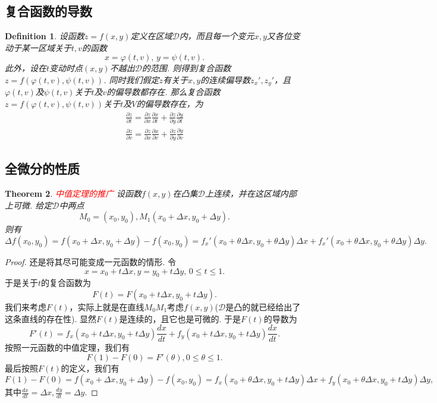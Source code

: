 \documentclass{article}
\newtheorem{theorem}{Theorem}[section]
\newtheorem{definition}[theorem]{Definition}
\newcommand{\redt}[1]{\textcolor{red}{#1}}
\begin{document}
\subsection{复合函数的导数}

\begin{definition}
\rm 设函数$z = f(x,y)$定义在区域$\mathcal{D}$内，而且每一个变元$x,y$又各位变动于某一区域关于$t,v$的函数
$$
x = \varphi(t,v),\, y = \psi(t,v).
$$
此外，设在$t$变动时点$(x,y)$不越出$\mathcal{D}$的范围. 则得到复合函数$z=f(\varphi(t,v),\psi(t,v))$. 同时我们假定$z$有关于$x,y$的连续偏导数$z_x',z_y'$，且$\varphi(t,v)$及$\psi(t,v)$关于$t$及$v$的偏导数都存在. 那么复合函数$z=f(\varphi(t,v),\psi(t,v))$关于$t$及$V$的偏导数存在，为
$$
\begin{array}{ll}
\frac{\partial z}{\partial t} = \frac{\partial z}{\partial x}\frac{\partial x}{\partial t} + \frac{\partial z}{\partial y}\frac{\partial y}{\partial t} \\
\frac{\partial z}{\partial v} = \frac{\partial z}{\partial x}\frac{\partial x}{\partial v} + \frac{\partial z}{\partial y}\frac{\partial y}{\partial v}
\end{array}
$$
\end{definition}

\subsection{全微分的性质}

\begin{theorem}
\rm \redt{中值定理的推广} 设函数$f(x,y)$在凸集$\mathcal{D}$上连续，并在这区域内部上可微. 给定$\mathcal{D}$中两点
$$
M_0 = (x_0,y_0), M_1(x_0+\Delta x,y_0 + \Delta y).
$$
则有
$$
\Delta f(x_0,y_0) = f(x_0+\Delta x, y_0 + \Delta y) - f(x_0,y_0) = f_x'(x_0+\theta\Delta x, y_0 + \theta\Delta y)\Delta x + f_x'(x_0+\theta\Delta x, y_0 + \theta\Delta y)\Delta y.
$$
\end{theorem}

\begin{proof}
还是将其尽可能变成一元函数的情形. 令
$$
x = x_0 + t\Delta x, y = y_0 + t\Delta y ,\, 0 \leq t \leq 1 .
$$
于是关于$t$的复合函数为
$$
F(t) = F(x_0 + t\Delta x,y_0 + t\Delta y).
$$
我们来考虑$F(t)$，实际上就是在直线$M_0M_1$考虑$f(x,y)$($\mathcal{D}$是凸的就已经给出了这条直线的存在性). 显然$F(t)$是连续的，且它也是可微的. 于是$F(t)$的导数为
$$
F'(t) = f_x(x_0 + t\Delta x,y_0 + t\Delta y)\frac{dx}{dt} + f_y(x_0 + t\Delta x,y_0 + t\Delta y)\frac{dx}{dt}. 
$$
按照一元函数的中值定理，我们有
$$
F(1)-F(0) = F'(\theta), 0 \leq \theta \leq 1.
$$
最后按照$F(t)$的定义，我们有
$$
F(1)-F(0) = f(x_0+\Delta x, y_0 + \Delta y) - f(x_0,y_0) = f_x(x_0 + \theta\Delta x,y_0 + t\Delta y)\Delta x + f_y(x_0 + \theta\Delta x,y_0 + t\Delta y)\Delta y,
$$
其中$\frac{dx}{dt} = \Delta x, \frac{dy}{dt} = \Delta y$. 
\end{proof}
\end{document}
